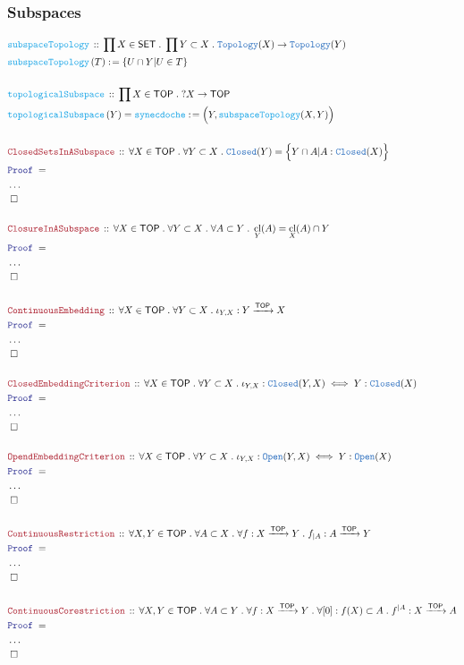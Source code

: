 \documentclass[12pt]{scrartcl}
\newcommand{\TYPE}[1]{\textcolor{NavyBlue}{\mathtt{#1}}}
\newcommand{\FUNC}[1]{\textcolor{Cerulean}{\mathtt{#1}}}
\newcommand{\LOGIC}[1]{\textcolor{Blue}{\mathtt{#1}}}
\newcommand{\THM}[1]{\textcolor{Maroon}{\mathtt{#1}}}
\renewcommand{\.}{\; . \;}
\newcommand{\de}{: \kern 0.1pc =}
\newcommand{\Act}[1]{\left( #1 \right)}
\newcommand{\Theorem}[2]{& \THM{#1} \, :: \, #2 \\ & \Proof = \\ }
\newcommand{\DeclareFunc}[2]{& \FUNC{#1} \, :: \, #2 \\}
\newcommand{\DefineFunc}[3]{&  \FUNC{#1}\Act{#2} \de #3 \\}
\newcommand{\DefineNamedFunc}[4]{&  \FUNC{#1}\Act{#2} = #3 \de #4 \\}
\newcommand{\Page}[1]{ \begin{align*} #1 \end{align*}   }
\newcommand{\NoProof}{ & \ldots \\ \EndProof}
\newcommand{\Arrow}{\xrightarrow}
\newcommand{\QED}{\; \square}
\newcommand{\EndProof}{& \QED \\}
\newcommand{\Proof}{\LOGIC{Proof} \; }
\newcommand{\SET}{\mathsf{SET}}
\DeclareMathOperator*{\cl}{cl}
\newcommand{\TOP}{\mathsf{TOP}}
\begin{document}
\subsubsection{Subspaces}
\Page{
	\DeclareFunc{subspaceTopology}{\prod X \in \SET \. \prod Y \subset X \. \TYPE{Topology}(X) \to \TYPE{Topology}(Y)}
	\DefineFunc{subspaceTopology}{T}{\{ U \cap Y | U \in T  \}}
	\\
	\DeclareFunc{topologicalSubspace}{\prod X \in \TOP \. ?X \to \TOP}
	\DefineNamedFunc{topologicalSubspace}{Y}{\FUNC{synecdoche}}{ \Big( Y, \FUNC{subspaceTopology}(X,Y)\Big) }
	\\
	\Theorem{ClosedSetsInASubspace}
	{
		\forall X \in \TOP \.
		\forall Y \subset X \.
		\TYPE{Closed}(Y) = \Big\{ Y \cap A | A : \TYPE{Closed}(X)  \Big\}
	}
	\NoProof
	\\
	\Theorem{ClosureInASubspace}
	{
		\forall X \in \TOP \.
		\forall Y \subset X \.
		\forall A \subset Y \. 
		\cl_Y(A) = \cl_X(A) \cap Y
	}
	\NoProof
	\\
	\Theorem{ContinuousEmbedding}
	{
		\forall X \in \TOP \.
		\forall Y \subset X \.
		\iota_{Y,X} : Y \Arrow{\TOP} X
	}
	\NoProof
	\\
	\Theorem{ClosedEmbeddingCriterion}
	{
		\forall X \in \TOP \.
		\forall Y \subset X \.
		\iota_{Y,X} : \TYPE{Closed}(Y,X) \iff
		Y : \TYPE{Closed}(X)
	}
	\NoProof
	\\
	\Theorem{OpendEmbeddingCriterion}
	{
		\forall X \in \TOP \.
		\forall Y \subset X \.
		\iota_{Y,X} : \TYPE{Open}(Y,X) \iff
		Y : \TYPE{Open}(X)
	}
	\NoProof
	\\
	\Theorem{ContinuousRestriction}
	{
		\forall X,Y \in \TOP \.
		\forall A \subset X \.
		\forall f : X \Arrow{\TOP} Y \.
		f_{|A} : A \Arrow{\TOP} Y
	}
	\NoProof
	\\
	\Theorem{ContinuousCorestriction}
	{
		\forall X,Y \in \TOP \.
		\forall  A \subset Y \.
		\forall f : X \Arrow{\TOP} Y \.
		\forall [0] : f(X) \subset A \.
		f^{|A} : X \Arrow{\TOP} A
	}
	\NoProof
}
\end{document}
